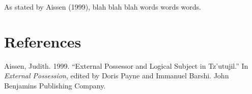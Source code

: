 \documentclass[
]{article}
\newlength{\cslhangindent}
\newlength{\cslentryspacingunit} %
\newenvironment{CSLReferences}[2] %
 {%
  \setlength{\parindent}{0pt}
  \ifodd #1
  \let\oldpar\par
  \def\par{\hangindent=\cslhangindent\oldpar}
  \fi
  \setlength{\parskip}{#2\cslentryspacingunit}
 }%
 {}
\begin{document}
As stated by Aissen (1999), blah blah blah words words words.

\newpage

\hypertarget{references}{%
\section*{References}\label{references}}

\hypertarget{refs}{}
\begin{CSLReferences}{1}{0}
\leavevmode{}%
Aissen, Judith. 1999. {``External Possessor and Logical Subject in
Tz'utujil.''} In \emph{External Possession}, edited by Doris Payne and
Immanuel Barshi. John Benjamins Publishing Company.

\end{CSLReferences}
\end{document}

